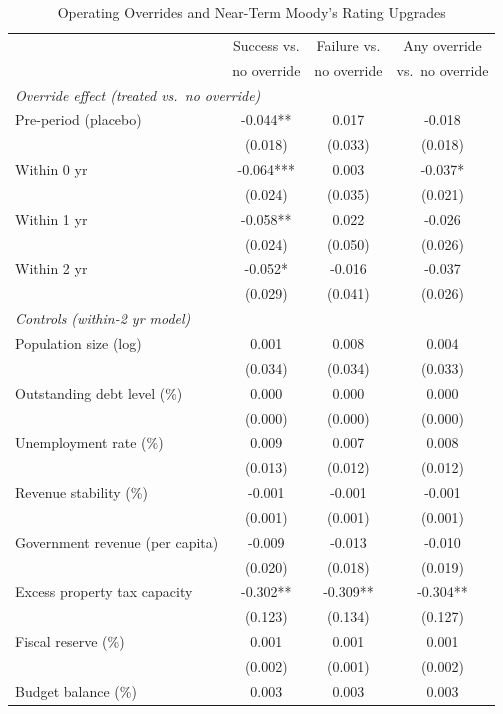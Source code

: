 \begin{table}[!htbp]
\centering
\caption{Operating Overrides and Near-Term Moody's Rating Upgrades}
\label{tab:post_northeast_did_upgrade}
\small
\begin{tabular}{lccc}
\toprule
 & Success vs. & Failure vs. & Any override \\
 & no override & no override & vs.\ no override \\
\midrule
\multicolumn{4}{l}{\textit{Override effect (treated vs.\ no override)}} \\
\quad Pre-period (placebo) & -0.044** & 0.017 & -0.018 \\
 & (0.018) & (0.033) & (0.018) \\
\quad Within 0 yr & -0.064*** & 0.003 & -0.037* \\
 & (0.024) & (0.035) & (0.021) \\
\quad Within 1 yr & -0.058** & 0.022 & -0.026 \\
 & (0.024) & (0.050) & (0.026) \\
\quad Within 2 yr & -0.052* & -0.016 & -0.037 \\
 & (0.029) & (0.041) & (0.026) \\
\midrule
\multicolumn{4}{l}{\textit{Controls (within-2 yr model)}} \\
\quad Population size (log) & 0.001 & 0.008 & 0.004 \\
 & (0.034) & (0.034) & (0.033) \\
\quad Outstanding debt level (\%) & 0.000 & 0.000 & 0.000 \\
 & (0.000) & (0.000) & (0.000) \\
\quad Unemployment rate (\%) & 0.009 & 0.007 & 0.008 \\
 & (0.013) & (0.012) & (0.012) \\
\quad Revenue stability (\%) & -0.001 & -0.001 & -0.001 \\
 & (0.001) & (0.001) & (0.001) \\
\quad Government revenue (per capita) & -0.009 & -0.013 & -0.010 \\
 & (0.020) & (0.018) & (0.019) \\
\quad Excess property tax capacity & -0.302** & -0.309** & -0.304** \\
 & (0.123) & (0.134) & (0.127) \\
\quad Fiscal reserve (\%) & 0.001 & 0.001 & 0.001 \\
 & (0.002) & (0.001) & (0.002) \\
\quad Budget balance (\%) & 0.003 & 0.003 & 0.003 \\

\end{tabular}
\end{table}
